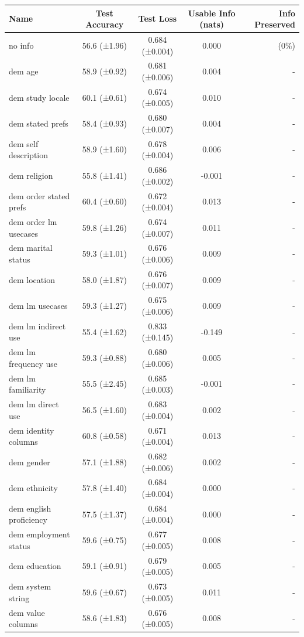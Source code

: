 \documentclass[11pt]{article}
\begin{document}
\begin{table}[h]
\centering
\small
\begin{tabular}{|l|c|c|c|r|}
\hline
Name & Test Accuracy & Test Loss & Usable Info (nats) & Info Preserved \\
\hline
no info & 56.6 (±1.96) & 0.684 (±0.004) & 0.000 & (0\%) \\
dem age & 58.9 (±0.92) & 0.681 (±0.006) & 0.004 & - \\
dem study locale & 60.1 (±0.61) & 0.674 (±0.005) & 0.010 & - \\
dem stated prefs & 58.4 (±0.93) & 0.680 (±0.007) & 0.004 & - \\
dem self description & 58.9 (±1.60) & 0.678 (±0.004) & 0.006 & - \\
dem religion & 55.8 (±1.41) & 0.686 (±0.002) & -0.001 & - \\
dem order stated prefs & 60.4 (±0.60) & 0.672 (±0.004) & 0.013 & - \\
dem order lm usecases & 59.8 (±1.26) & 0.674 (±0.007) & 0.011 & - \\
dem marital status & 59.3 (±1.01) & 0.676 (±0.006) & 0.009 & - \\
dem location & 58.0 (±1.87) & 0.676 (±0.007) & 0.009 & - \\
dem lm usecases & 59.3 (±1.27) & 0.675 (±0.006) & 0.009 & - \\
dem lm indirect use & 55.4 (±1.62) & 0.833 (±0.145) & -0.149 & - \\
dem lm frequency use & 59.3 (±0.88) & 0.680 (±0.006) & 0.005 & - \\
dem lm familiarity & 55.5 (±2.45) & 0.685 (±0.003) & -0.001 & - \\
dem lm direct use & 56.5 (±1.60) & 0.683 (±0.004) & 0.002 & - \\
dem identity columns & 60.8 (±0.58) & 0.671 (±0.004) & 0.013 & - \\
dem gender & 57.1 (±1.88) & 0.682 (±0.006) & 0.002 & - \\
dem ethnicity & 57.8 (±1.40) & 0.684 (±0.004) & 0.000 & - \\
dem english proficiency & 57.5 (±1.37) & 0.684 (±0.004) & 0.000 & - \\
dem employment status & 59.6 (±0.75) & 0.677 (±0.005) & 0.008 & - \\
dem education & 59.1 (±0.91) & 0.679 (±0.005) & 0.005 & - \\
dem system string & 59.6 (±0.67) & 0.673 (±0.005) & 0.011 & - \\
dem value columns & 58.6 (±1.83) & 0.676 (±0.005) & 0.008 & - \\

\end{tabular}
\end{table}
\end{document}
